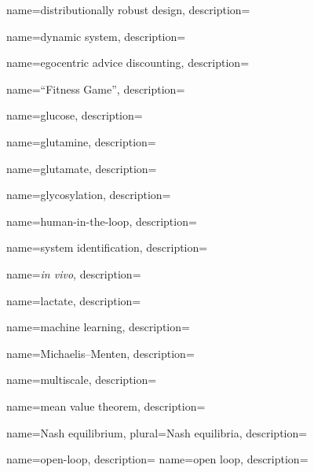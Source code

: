 	{
		name={distributionally robust design},
		description={}
	}
	
	{
		name={dynamic system},
		description={}
	}		


	{
		name={egocentric advice discounting},
		description={}
	}


	{
		name={``Fitness Game''},
		description={}
	}


	{
		name={glucose},
		description={}
	}
	
	{
		name={glutamine},
		description={}
	}	
	
	{
		name={glutamate},
		description={}
	}		


	{
		name={glycosylation},
		description={}
	}	


	{
		name={human-in-the-loop},
		description={}
	}
	

	{
		name={system identification},
		description={}
	}

	{
		name={\textit{in vivo}},		
		description={}
	}
	

	{
		name={lactate},
		description={}
	}	
	

	{
		name={machine learning},
		description={}
	}	

	{
		name={Michaelis--Menten},
		description={}
	}		


	{
		name={multiscale},
		description={}
	}		


	{
		name={mean value theorem},
		description={}
	}		
	

	{
		name={Nash equilibrium},
		plural={Nash equilibria},
		description={}
	}
	

	{
		name={open-loop},
		description={}
	}
	{
		name={open loop},
		description={}
	}	

